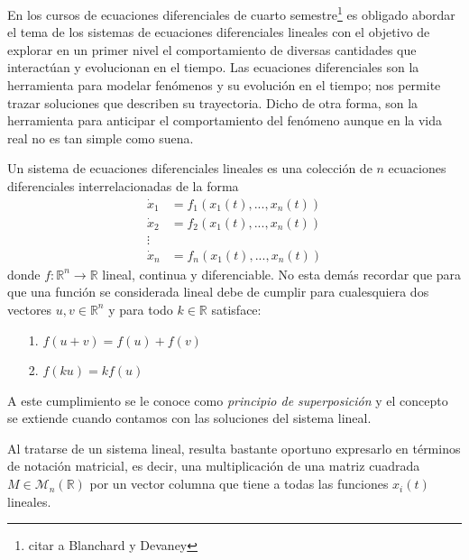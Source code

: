 En los cursos de ecuaciones diferenciales de cuarto semestre\footnote{citar a Blanchard y Devaney} es obligado abordar el tema de los sistemas de ecuaciones diferenciales lineales con el objetivo de explorar en un primer nivel el comportamiento de diversas cantidades que interactúan y evolucionan en el tiempo. Las ecuaciones diferenciales son la herramienta para modelar fenómenos y su evolución en el tiempo; nos permite trazar soluciones que describen su trayectoria. Dicho de otra forma, son la herramienta para anticipar el comportamiento del fenómeno aunque en la vida real no es tan simple como suena.
\begin{definición}
	Un sistema de ecuaciones diferenciales lineales es una colección de $n$ ecuaciones diferenciales interrelacionadas de la forma
	\begin{equation}\label{eqn:sistemaLineal}
		\begin{split}
			\dot{x}_1 &= f_1(x_1(t),...,x_n(t))\\
			\dot{x}_2 &= f_2(x_1(t),...,x_n(t))\\
			\vdots\\
			\dot{x}_n &= f_n(x_1(t),...,x_n(t))
		\end{split}
	\end{equation}
	donde $f:\mathbb{R}^n\to\mathbb{R}$ lineal, continua y diferenciable. No esta demás recordar que para que una función se considerada lineal debe de cumplir para cualesquiera dos vectores $u,v \in\mathbb{R}^n$ y para todo $k\in\mathbb{R}$ satisface:
	\begin{itemize}
		\item [1.] $f(u+v)=f(u)+f(v)$
		\item [2.] $f(ku)=kf(u)$
	\end{itemize}
	A este cumplimiento se le conoce como \textit{principio de superposición} y el concepto se extiende cuando contamos con las soluciones del sistema lineal.
\end{definición}
Al tratarse de un sistema lineal, resulta bastante oportuno expresarlo en términos de notación matricial, es decir, una multiplicación de una matriz cuadrada $M\in\mathcal{M}_n(\mathbb{R})$ por un vector columna que tiene a todas las funciones $x_i(t)$ lineales.
